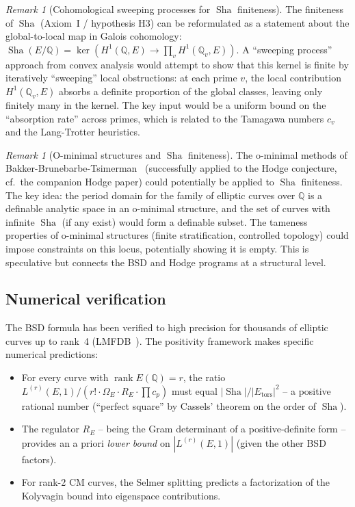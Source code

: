 \documentclass[aps,prd,twocolumn,superscriptaddress,nofootinbib]{revtex4-2}
\theoremstyle{definition}
\theoremstyle{remark}
\newtheorem{remark}[theorem]{Remark}
\DeclareMathOperator{\rank}{rank}
\DeclareMathOperator{\Sha}{Sha}
\begin{document}
\begin{remark}[Cohomological sweeping processes for $\Sha$ finiteness]
\label{rem:sweeping-sha}
The finiteness of $\Sha$ (Axiom~I / hypothesis H3) can be reformulated as a statement about the global-to-local map in Galois cohomology: $\Sha(E/\mathbb{Q}) = \ker\!\left(H^1(\mathbb{Q}, E) \to \prod_v H^1(\mathbb{Q}_v, E)\right)$. A ``sweeping process'' approach from convex analysis would attempt to show that this kernel is finite by iteratively ``sweeping'' local obstructions: at each prime $v$, the local contribution $H^1(\mathbb{Q}_v, E)$ absorbs a definite proportion of the global classes, leaving only finitely many in the kernel. The key input would be a uniform bound on the ``absorption rate'' across primes, which is related to the Tamagawa numbers $c_v$ and the Lang-Trotter heuristics.
\end{remark}

\begin{remark}[O-minimal structures and $\Sha$ finiteness]
\label{rem:o-minimal-sha}
The o-minimal methods of Bakker-Brunebarbe-Tsimerman~\cite{BBT2020} (successfully applied to the Hodge conjecture, cf.\ the companion Hodge paper) could potentially be applied to $\Sha$ finiteness. The key idea: the period domain for the family of elliptic curves over $\mathbb{Q}$ is a definable analytic space in an o-minimal structure, and the set of curves with infinite $\Sha$ (if any exist) would form a definable subset. The tameness properties of o-minimal structures (finite stratification, controlled topology) could impose constraints on this locus, potentially showing it is empty. This is speculative but connects the BSD and Hodge programs at a structural level.
\end{remark}

\subsection{Numerical verification}
\label{sec:numerical}

The BSD formula has been verified to high precision for thousands of elliptic curves up to rank~4 (LMFDB~\cite{LMFDB}). The positivity framework makes specific numerical predictions:
\begin{itemize}
\item For every curve with $\rank E(\mathbb{Q}) = r$, the ratio $L^{(r)}(E,1)/(r! \cdot \Omega_E \cdot R_E \cdot \prod c_p)$ must equal $|\Sha|/|E_{\mathrm{tors}}|^2$ -- a positive rational number (``perfect square'' by Cassels' theorem on the order of $\Sha$).
\item The regulator $R_E$ -- being the Gram determinant of a positive-definite form -- provides an a priori \textit{lower bound} on $|L^{(r)}(E,1)|$ (given the other BSD factors).
\item For rank-2 CM curves, the Selmer splitting predicts a factorization of the Kolyvagin bound into eigenspace contributions.
\end{itemize}
\end{document}
